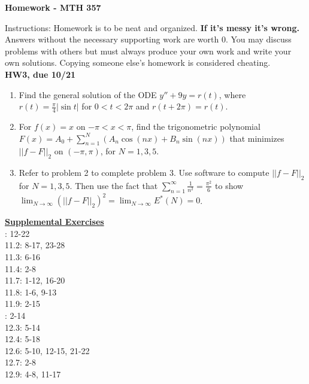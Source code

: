 \documentclass[10pt]{article}
\begin{document}
\begin{center}
{\Large\bf  Homework - MTH 357}\\
\vspace{.1in}

\end{center}

\noindent Instructions:  %
Homework is to be neat and organized.  \textbf{If it's messy it's wrong.} Answers without the necessary supporting work are worth 0.   You may discuss problems with others but must always produce your own work and write your own solutions.  Copying someone else's homework is considered cheating.\\




\noindent \textbf{HW3, due 10/21}
\begin{enumerate}
\item Find the general solution of the ODE $y''+9y=r(t)$, where $r(t)=\frac{\pi}{4}|\sin{t}|$ for $0<t<2\pi$ and $r(t+2\pi)=r(t)$.
\item For $f(x)=x$ on $-\pi<x<\pi$, find the trigonometric polynomial $F(x)=A_0 +\displaystyle\sum_{n=1}^N \left(A_n\cos{(nx)}+B_n\sin{(nx)}\right)$ that minimizes $||f-F||_2$ on $(-\pi,\pi)$, for $N=1,3,5$.
\item Refer to problem 2 to complete problem 3. Use software to compute $||f-F||_2$ for $N=1,3,5$. Then use the fact that $\displaystyle\sum_{n=1}^\infty \frac{1}{n^2}=\frac{\pi^2}{6}$ to show $\displaystyle\lim_{N\to\infty}(||f-F||_2)^2=\displaystyle\lim_{N\to\infty}E^*(N)=0$.
\end{enumerate}



\vspace{.5in}
\noindent \underline{\textbf{Supplemental Exercises}}\\


: 12-22\\
11.2: 8-17, 23-28\\
11.3: 6-16\\
11.4: 2-8\\
11.7: 1-12, 16-20\\
11.8: 1-6, 9-13\\
11.9: 2-15\\

: 2-14\\
12.3: 5-14\\
12.4: 5-18\\
12.6: 5-10, 12-15, 21-22\\
12.7: 2-8\\
12.9: 4-8, 11-17\\
\end{document}
